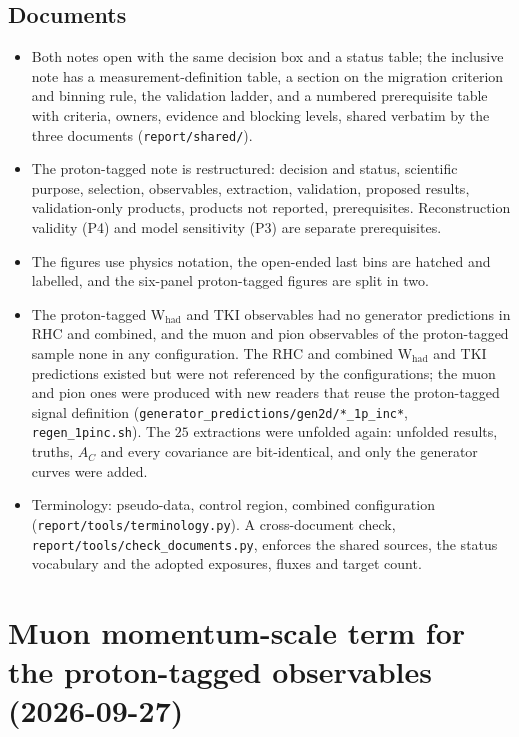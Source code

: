 \subsection{Documents}
\begin{itemize}\itemsep1pt
  \item Both notes open with the same decision box and a status table; the inclusive note has a
    measurement-definition table, a section on the migration criterion and binning rule, the validation
    ladder, and a numbered prerequisite table with criteria, owners, evidence and blocking levels, shared
    verbatim by the three documents (\texttt{report/shared/}).
  \item The proton-tagged note is restructured: decision and status, scientific purpose, selection,
    observables, extraction, validation, proposed results, validation-only products, products not
    reported, prerequisites. Reconstruction validity (P4) and model sensitivity (P3) are separate
    prerequisites.
  \item The figures use physics notation, the open-ended last bins are hatched and labelled, and the
    six-panel proton-tagged figures are split in two.
  \item The proton-tagged W$_\mathrm{had}$ and TKI observables had no generator predictions in RHC and
    combined, and the muon and pion observables of the proton-tagged sample none in any configuration.
    The RHC and combined W$_\mathrm{had}$ and TKI predictions existed but were not referenced by the
    configurations; the muon and pion ones were produced with new readers that reuse the proton-tagged
    signal definition (\texttt{generator\_predictions/gen2d/*\_1p\_inc*}, \texttt{regen\_1pinc.sh}).
    The $25$ extractions were unfolded again: unfolded results, truths, $A_C$ and every covariance are
    bit-identical, and only the generator curves were added.
  \item Terminology: pseudo-data, control region, combined configuration
    (\nolinkurl{report/tools/terminology.py}). A cross-document check,
    \nolinkurl{report/tools/check_documents.py}, enforces the shared sources, the status vocabulary and the
    adopted exposures, fluxes and target count.
\end{itemize}

\section{Muon momentum-scale term for the proton-tagged observables (2026-09-27)}

